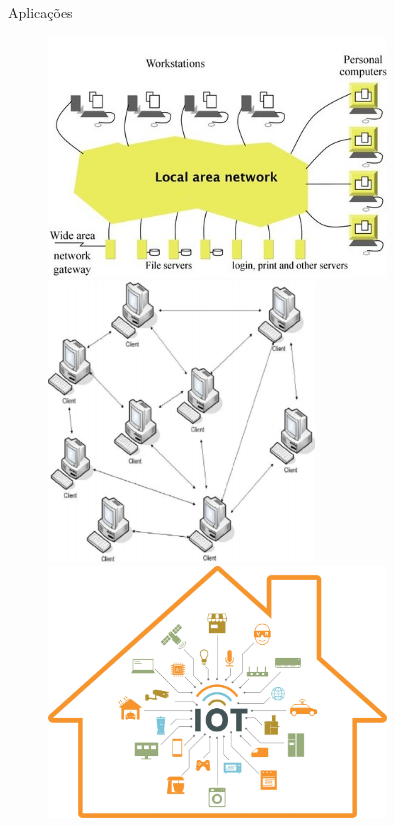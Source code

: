 \documentclass[compress]{beamer}
\begin{document}
\begin{frame}{Aplicações}

\vspace{1cm}

\begin{figure}
    \begin{overprint}
    \centering\includegraphics[width=0.80\textwidth]{images/laboratorio.jpg}
    \centering\includegraphics[width=0.63\textwidth]{images/p2p.png}
    \centering\includegraphics[width=0.80\textwidth]{images/iot.jpg}

\end{overprint}
\end{figure}
\end{frame}
\end{document}
